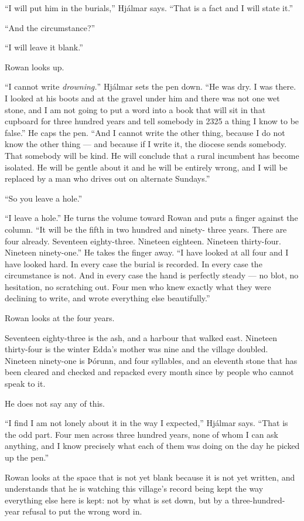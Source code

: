 \documentclass[11pt,oneside]{book}
\begin{document}
``I will put him in the burials,'' Hjálmar says. ``That is a fact and I
will state it.''

``And the circumstance?''

``I will leave it blank.''

Rowan looks up.

``I cannot write \emph{drowning.}'' Hjálmar sets the pen down. ``He was
dry. I was there. I looked at his boots and at the gravel under him and
there was not one wet stone, and I am not going to put a word into a
book that will sit in that cupboard for three hundred years and tell
somebody in 2325 a thing I know to be false.'' He caps the pen. ``And I
cannot write the other thing, because I do not know the other thing ---
and because if I write it, the diocese sends somebody. That somebody
will be kind. He will conclude that a rural incumbent has become
isolated. He will be gentle about it and he will be entirely wrong, and
I will be replaced by a man who drives out on alternate Sundays.''

``So you leave a hole.''

``I leave a hole.'' He turns the volume toward Rowan and puts a finger
against the column. ``It will be the fifth in two hundred and ninety-
three years. There are four already. Seventeen eighty-three. Nineteen
eighteen. Nineteen thirty-four. Nineteen ninety-one.'' He takes the
finger away. ``I have looked at all four and I have looked hard. In
every case the burial is recorded. In every case the circumstance is
not. And in every case the hand is perfectly steady --- no blot, no
hesitation, no scratching out. Four men who knew exactly what they were
declining to write, and wrote everything else beautifully.''

Rowan looks at the four years.

Seventeen eighty-three is the ash, and a harbour that walked east.
Nineteen thirty-four is the winter Edda's mother was nine and the
village doubled. Nineteen ninety-one is Þórunn, and four syllables, and
an eleventh stone that has been cleared and checked and repacked every
month since by people who cannot speak to it.

He does not say any of this.

``I find I am not lonely about it in the way I expected,'' Hjálmar says.
``That is the odd part. Four men across three hundred years, none of
whom I can ask anything, and I know precisely what each of them was
doing on the day he picked up the pen.''

Rowan looks at the space that is not yet blank because it is not yet
written, and understands that he is watching this village's record being
kept the way everything else here is kept: not by what is set down, but
by a three-hundred-year refusal to put the wrong word in.
\end{document}
